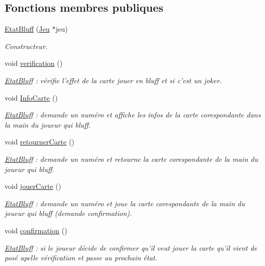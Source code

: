 \subsection*{Fonctions membres publiques}
\begin{DoxyCompactItemize}
\item 
\hyperlink{class_etat_bluff_adf5d424eb972450d3a78cc8974a6be44}{Etat\-Bluff} (\hyperlink{class_jeu}{Jeu} $\ast$jeu)
\begin{DoxyCompactList}\small\item\em Constructeur. \end{DoxyCompactList}\item 
void \hyperlink{class_etat_bluff_a87a7f546cb71b52ac869ac41439d49bf}{verification} ()
\begin{DoxyCompactList}\small\item\em \hyperlink{class_etat_bluff}{Etat\-Bluff} \-: vérifie l'effet de la carte jouer en bluff et si c'est un joker. \end{DoxyCompactList}\item 
void \hyperlink{class_etat_bluff_a9a50082e841c2ef7781795d546d77b3e}{Info\-Carte} ()
\begin{DoxyCompactList}\small\item\em \hyperlink{class_etat_bluff}{Etat\-Bluff} \-: demande un numéro et affiche les infos de la carte corespondante dans la main du joueur qui bluff. \end{DoxyCompactList}\item 
void \hyperlink{class_etat_bluff_ad5f658d6e71112d9489927104cc4da4c}{retourner\-Carte} ()
\begin{DoxyCompactList}\small\item\em \hyperlink{class_etat_bluff}{Etat\-Bluff} \-: demande un numéro et retourne la carte corespondante de la main du joueur qui bluff. \end{DoxyCompactList}\item 
void \hyperlink{class_etat_bluff_a087b8aa9f445736eba04d9811b3ec8e8}{jouer\-Carte} ()
\begin{DoxyCompactList}\small\item\em \hyperlink{class_etat_bluff}{Etat\-Bluff} \-: demande un numéro et joue la carte corespondante de la main du joueur qui bluff (demande confirmation). \end{DoxyCompactList}\item 
void \hyperlink{class_etat_bluff_a7933ee4cc543982cdfe62bfe1a50c765}{confirmation} ()
\begin{DoxyCompactList}\small\item\em \hyperlink{class_etat_bluff}{Etat\-Bluff} \-: si le joueur décide de confirmer qu'il veut jouer la carte qu'il vient de posé apelle vérification et passe au prochain état. \end{DoxyCompactList}\item 

\end{DoxyCompactItemize}
